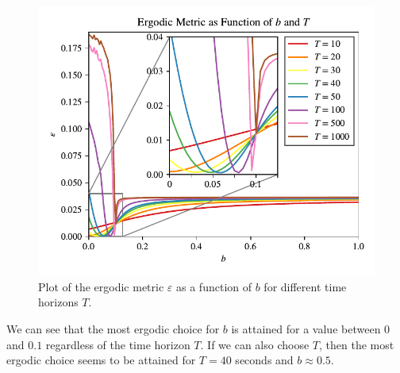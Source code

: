 \begin{figure}[h]
    \centering
    \includegraphics[]{ergodic_metric_final_extended.pdf}
    \vspace{-5mm}
    \caption{Plot of the ergodic metric $\varepsilon$ as a function of $b$ for different time horizons $T$.}
    \label{fig:ergodic}
\end{figure}
We can see that the most ergodic choice for $b$ is attained for a value between $0$ and $0.1$ regardless of the time horizon $T$. 
If we can also choose $T$, then the most ergodic choice seems to be attained for $T=40$ seconds and $b\approx0.5$.